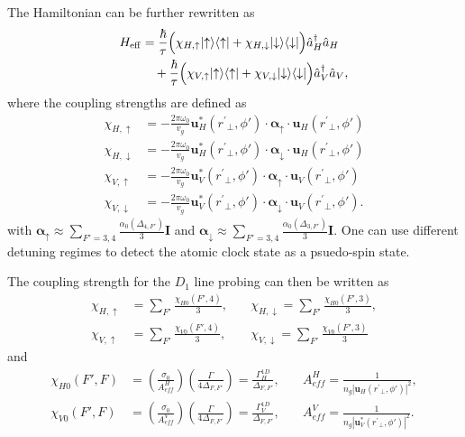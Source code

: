 \documentclass[preprint,aps,pra,onecolumn]{revtex4-1} %
\renewcommand{\tensor}[1]{\boldsymbol{#1}}
\begin{document}
The Hamiltonian can be further rewritten as
\begin{align}
H_{\rm eff} & = \frac{ \hbar }{ \tau}\Big( \chi_{H,\uparrow}\lvert{\uparrow}\rangle\langle{\uparrow}\rvert +  \chi_{H,\downarrow} \lvert{\downarrow}\rangle\langle{\downarrow}\rvert \Big) \hat{a}_H^\dagger \hat{a}_H \nonumber\\
&\quad +  \frac{ \hbar }{ \tau} \Big( \chi_{V,\uparrow}\lvert{\uparrow}\rangle\langle{\uparrow}\rvert +  \chi_{V,\downarrow} \lvert{\downarrow}\rangle\langle{\downarrow}\rvert \Big) \hat{a}_V^\dagger \hat{a}_V  ,
\end{align}
where the coupling strengths are defined as
\begin{align}
\chi_{H,\uparrow} &=  -\frac{2\pi\omega_0}{v_g} \mathbf{u}^*_{H}(r^\prime\!\!_\perp,\phi') \cdot\tensor{\alpha}_{\uparrow}\cdot \mathbf{u}_{H}(r^\prime\!\!_\perp,\phi') \\
\chi_{H,\downarrow} &=  -\frac{2\pi\omega_0}{v_g} \mathbf{u}^*_{H}(r^\prime\!\!_\perp,\phi') \cdot\tensor{\alpha}_{\downarrow}\cdot \mathbf{u}_{H}(r^\prime\!\!_\perp,\phi') \\
\chi_{V,\uparrow} &=  -\frac{2\pi\omega_0}{v_g}  \mathbf{u}^*_{V}(r^\prime\!\!_\perp,\phi') \cdot\tensor{\alpha}_{\uparrow}\cdot \mathbf{u}_{V}(r^\prime\!\!_\perp,\phi')  \\
\chi_{V,\downarrow} &=  -\frac{2\pi\omega_0}{v_g}  \mathbf{u}^*_{V}(r^\prime\!\!_\perp,\phi') \cdot\tensor{\alpha}_{\downarrow}\cdot \mathbf{u}_{V}(r^\prime\!\!_\perp,\phi'). 
\end{align}
with $\tensor{\alpha}_{\uparrow} \approx\sum_{F'=3,4}\frac{\alpha_0(\Delta_{4,F'})}{3}\mathbf{I}$
and $\tensor{\alpha}_{\downarrow} \approx\sum_{F'=3,4}\frac{\alpha_0(\Delta_{3,F'})}{3}\mathbf{I}$.
One can use different detuning regimes to detect the atomic clock state as a psuedo-spin state.

The coupling strength for the $ D_1 $ line probing can then be written as
\begin{align}
\chi_{H,\uparrow} &=  \sum_{F'} \frac{\chi_{H0}(F',4)}{3}, \quad
&\chi_{H,\downarrow} = \sum_{F'} \frac{\chi_{H0}(F',3) }{3}, \\
\chi_{V,\uparrow} &=  \sum_{F'} \frac{\chi_{V0}(F',4)}{3}, \quad
&\chi_{V,\downarrow} = \sum_{F'} \frac{\chi_{V0}(F',3) }{3} 
\end{align}
and 
\begin{align}
\chi_{H0}(F',F) &= \left( \frac{ \sigma_0}{A_{ef\!f}^H} \right) \left( \frac{\Gamma}{4 \Delta_{F,F'}} \right)=\frac{\Gamma_H^{1D}}{\Delta_{F,F'}},\quad
& A_{ef\!f}^H = \frac{1}{n_g|\mathbf{u}_{H}(r^\prime\!\!_\perp,\phi')|^2 },\\
\chi_{V0}(F',F) &= \left( \frac{ \sigma_0}{A_{ef\!f}^V} \right) \left( \frac{\Gamma}{4 \Delta_{F,F'}} \right)=\frac{\Gamma_V^{1D}}{\Delta_{F,F'}},\quad
& A_{ef\!f}^V = \frac{1}{n_g|\mathbf{u}^*_{V}(r^\prime\!\!_\perp,\phi')|^2 }.
\end{align}
\end{document}
